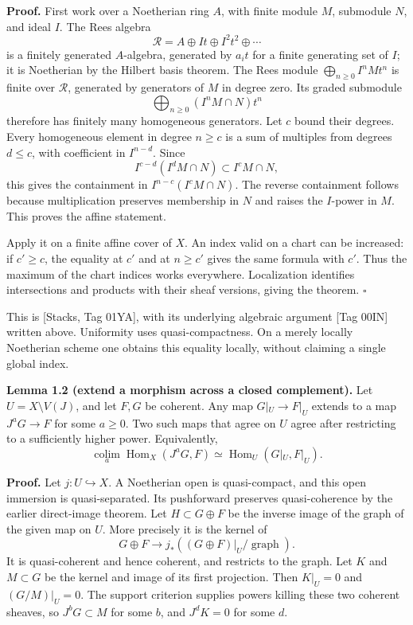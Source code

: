 \documentclass[11pt]{article}
\begin{document}
\textbf{Proof.} First work over a Noetherian ring \(A\), with finite
module \(M\), submodule \(N\), and ideal \(I\). The Rees algebra \[
\mathcal R=A\oplus It\oplus I^2t^2\oplus\cdots
\] is a finitely generated \(A\)-algebra, generated by \(a_it\) for a
finite generating set of \(I\); it is Noetherian by the Hilbert basis
theorem. The Rees module \(\bigoplus_{n\ge0}I^nM t^n\) is finite over
\(\mathcal R\), generated by generators of \(M\) in degree zero. Its
graded submodule \[
\bigoplus_{n\ge0}(I^nM\cap N)t^n
\] therefore has finitely many homogeneous generators. Let \(c\) bound
their degrees. Every homogeneous element in degree \(n\ge c\) is a sum
of multiples from degrees \(d\le c\), with coefficient in \(I^{n-d}\).
Since \[
I^{c-d}(I^dM\cap N)\subset I^cM\cap N,
\] this gives the containment in \(I^{n-c}(I^cM\cap N)\). The reverse
containment follows because multiplication preserves membership in \(N\)
and raises the \(I\)-power in \(M\). This proves the affine statement.

Apply it on a finite affine cover of \(X\). An index valid on a chart
can be increased: if \(c'\ge c\), the equality at \(c'\) and at
\(n\ge c'\) gives the same formula with \(c'\). Thus the maximum of the
chart indices works everywhere. Localization identifies intersections
and products with their sheaf versions, giving the theorem. \(\square\)

This is {[}Stacks, Tag 01YA{]}, with its underlying algebraic argument
{[}Tag 00IN{]} written above. Uniformity uses quasi-compactness. On a
merely locally Noetherian scheme one obtains this equality locally,
without claiming a single global index.

\textbf{Lemma 1.2 (extend a morphism across a closed complement).} Let
\(U=X\setminus V(J)\), and let \(F,G\) be coherent. Any map
\(G|_U\to F|_U\) extends to a map \(J^aG\to F\) for some \(a\ge0\). Two
such maps that agree on \(U\) agree after restricting to a sufficiently
higher power. Equivalently, \[
\underset{a}{\operatorname{colim}}\operatorname{Hom}_X(J^aG,F)
\simeq\operatorname{Hom}_U(G|_U,F|_U).
\]

\textbf{Proof.} Let \(j:U\hookrightarrow X\). A Noetherian open is
quasi-compact, and this open immersion is quasi-separated. Its
pushforward preserves quasi-coherence by the earlier direct-image
theorem. Let \(H\subset G\oplus F\) be the inverse image of the graph of
the given map on \(U\). More precisely it is the kernel of \[
G\oplus F\longrightarrow j_*((G\oplus F)|_U/\operatorname{graph}).
\] It is quasi-coherent and hence coherent, and restricts to the graph.
Let \(K\) and \(M\subset G\) be the kernel and image of its first
projection. Then \(K|_U=0\) and \((G/M)|_U=0\). The support criterion
supplies powers killing these two coherent sheaves, so \(J^bG\subset M\)
for some \(b\), and \(J^dK=0\) for some \(d\).
\end{document}
